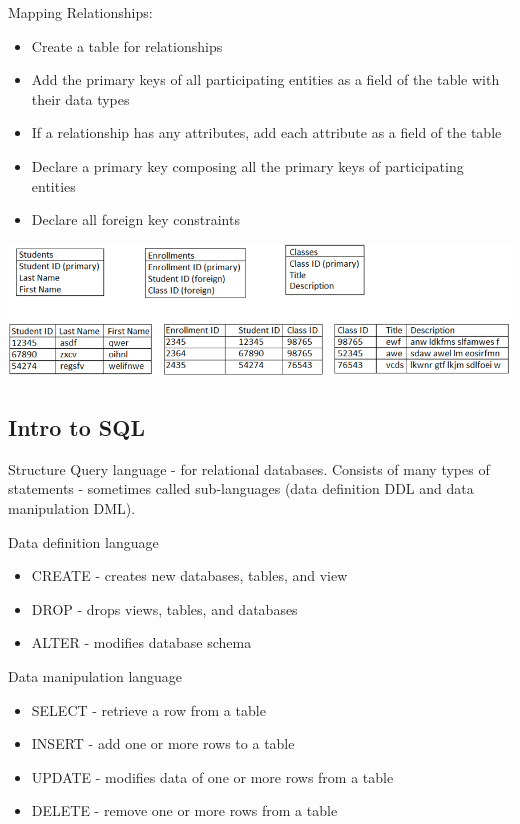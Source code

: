 \documentclass{article}
\begin{document}
    Mapping Relationships:
    \begin{itemize}
        \item Create a table for relationships 
        \item Add the primary keys of all participating entities as a field of the table 
        with their data types 
        \item If a relationship has any attributes, add each attribute as a field of the 
        table
        \item Declare a primary key composing all the primary keys of participating 
        entities 
        \item Declare all foreign key constraints
    \end{itemize}

    \begin{center}
        \includegraphics[scale=0.5]{relational_model.png}
    \end{center}

    \subsection*{Intro to SQL}

    Structure Query language - for relational databases. Consists of many types of
    statements - sometimes called sub-languages (data definition DDL and data 
    manipulation DML).

    Data definition language 
    \begin{itemize}
        \item CREATE - creates new databases, tables, and view 
        \item DROP - drops views, tables, and databases 
        \item ALTER - modifies database schema
    \end{itemize}

    Data manipulation language
    \begin{itemize}
        \item SELECT - retrieve a row from a table 
        \item INSERT - add one or more rows to a table 
        \item UPDATE - modifies data of one or more rows from a table 
        \item DELETE - remove one or more rows from a table
    \end{itemize}
\end{document}
